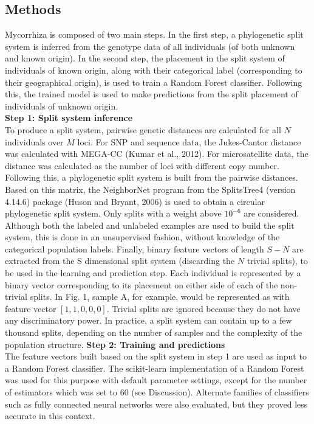 \documentclass{bioinfo}
\begin{document}
\begin{methods}
\section{Methods}
Mycorrhiza is composed of two main steps. In the first step, a phylogenetic split system is inferred from the genotype data of all individuals (of both unknown and known origin). In the second step, the placement in the split system of individuals of known origin, along with their categorical label (corresponding to their geographical origin), is used to train a Random Forest classifier. Following this, the trained model is used to make predictions from the split placement of individuals of unknown origin.\\
\textbf{Step 1: Split system inference}\\
To produce a split system, pairwise genetic distances are calculated for all $N$ individuals over $M$ loci. For SNP and sequence data, the Jukes-Cantor distance was calculated with MEGA-CC (Kumar et al., 2012). For microsatellite data, the distance was calculated as the number of loci with different copy number. Following this, a phylogenetic split system is built from the pairwise distances. Based on this matrix, the NeighborNet program from the SplitsTree4 (version 4.14.6) package (Huson and Bryant, 2006) is used to obtain a circular phylogenetic split system. Only splits with a weight above $10^{-6}$ are considered. Although both the labeled and unlabeled examples are used to build the split system, this is done in an unsupervised fashion, without knowledge of the categorical population labels. Finally, binary feature vectors of length $S - N$ are extracted from the S dimensional split system (discarding the $N$ trivial splits), to be used in the learning and prediction step. Each individual is represented by a binary vector corresponding to its placement on either side of each of the non-trivial splits. In Fig. 1, sample A, for example, would be represented as with feature vector $[1,1,0,0,0]$. Trivial splits are ignored because they do not have any discriminatory power. In practice, a split system can contain up to a few thousand splits, depending on the number of samples and the complexity of the population structure.
\textbf{Step 2: Training and predictions}\\
The feature vectors built based on the split system in step 1 are used as input to a Random Forest classifier. The scikit-learn implementation of a Random Forest was used for this purpose with default parameter settings, except for the number of estimators which was set to 60 (see Discussion). Alternate families of classifiers such as fully connected neural networks were also evaluated, but they proved less accurate in this context.\\

\end{methods}
\end{document}
